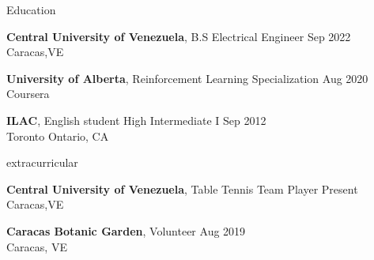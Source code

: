\documentclass{resume} %
\begin{document}
\begin{rSection}{Education} %

    \textbf{Central University of Venezuela}, B.S Electrical Engineer 
    \hfill {Sep 2022} \\ \hfill{Caracas,VE}

    \textbf{University of Alberta}, Reinforcement Learning Specialization  
    \hfill {Aug 2020} \\ 
    \hfill{Coursera}

    \textbf{ILAC}, English student High Intermediate I \hfill {Sep 2012} \\ 
    \hfill{Toronto Ontario, CA}

\end{rSection}



\begin{rSection}{extracurricular} %

    \textbf{Central University of Venezuela}, Table Tennis Team Player 
    \hfill {Present} \\ \hfill{Caracas,VE}

    \textbf{Caracas Botanic Garden}, Volunteer
    \hfill {Aug 2019} \\ 
    \hfill{Caracas, VE}

\end{rSection}
\end{document}
